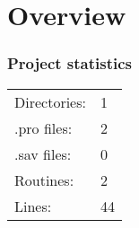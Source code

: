 \part{Overview}





\section*{Project statistics}

\begin{tabular}[t]{ll}
Directories: & 1 \\
.pro files: & 2 \\
.sav files: & 0 \\
Routines: & 2 \\
Lines: & 44 \\

\end{tabular}